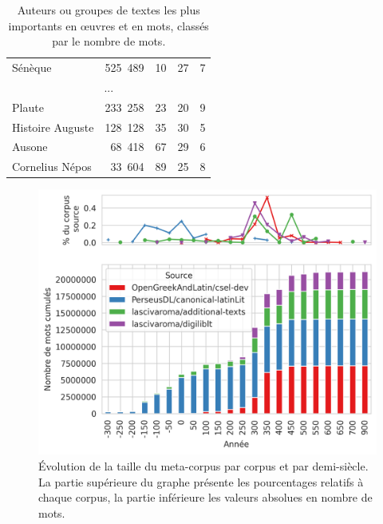 {\begin{table}
\begin{minipage}{.56\linewidth}
{\begin{tabular}{l|rr|rr}
                     Sénèque &   525~489 &         10 &       27 &             7 \\ 
                            \multicolumn{5}{c}{...}                \\
                      Plaute &   233~258 &         23 &       20 &             9 \\
            Histoire Auguste &   128~128 &         35 &       30 &             5 \\
                      Ausone &    68~418 &         67 &       29 &             6 \\
              Cornelius Népos &    33~604 &         89 &       25 &             8 \\
            \bottomrule
        \end{tabular}%
        }
        \caption{Auteurs ou groupes de textes les plus importants en œuvres et en mots, classés par le nombre de mots.}
        \label{tab:chap1:rang-auteurs}
\end{minipage}
\end{table}
\begin{figure}
    \centering
    \includegraphics[width=.9\linewidth]{figures/chap1/part2/motsPaCorpus.png}
    \caption{Évolution de la taille du meta-corpus par corpus et par demi-siècle. La partie supérieure du graphe présente les pourcentages relatifs à chaque corpus, la partie inférieure les valeurs absolues en nombre de mots.}
    \label{fig:chap1:mots-par-corpus}
\end{figure}
\clearpage
}

